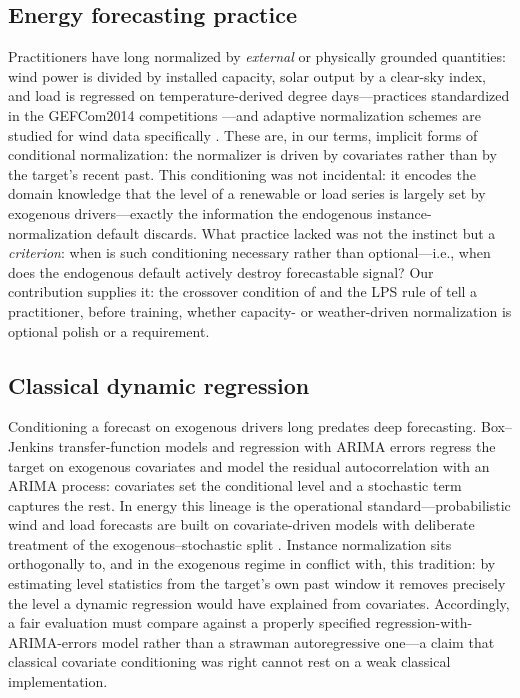 \subsection{Energy forecasting practice}

Practitioners have long normalized by \emph{external} or physically grounded quantities: wind power is divided by installed capacity, solar output by a clear-sky index, and load is regressed on temperature-derived degree days---practices standardized in the GEFCom2014 competitions \citep{hong2016gefcom}---and adaptive normalization schemes are studied for wind data specifically \citep{patil2022wind}. These are, in our terms, implicit forms of conditional normalization: the normalizer is driven by covariates rather than by the target's recent past. This conditioning was not incidental: it encodes the domain knowledge that the level of a renewable or load series is largely set by exogenous drivers---exactly the information the endogenous instance-normalization default discards. What practice lacked was not the instinct but a \emph{criterion}: when is such conditioning necessary rather than optional---i.e., when does the endogenous default actively destroy forecastable signal? Our contribution supplies it: the crossover condition of  and the LPS rule of  tell a practitioner, before training, whether capacity- or weather-driven normalization is optional polish or a requirement.

\subsection{Classical dynamic regression}

Conditioning a forecast on exogenous drivers long predates deep forecasting. Box--Jenkins transfer-function models and regression with ARIMA errors \citep{box1970time, hyndman2021fpp} regress the target on exogenous covariates and model the residual autocorrelation with an ARIMA process: covariates set the conditional level and a stochastic term captures the rest. In energy this lineage is the operational standard---probabilistic wind and load forecasts are built on covariate-driven models with deliberate treatment of the exogenous--stochastic split \citep{pinson2013wind, hong2016gefcom}. Instance normalization sits orthogonally to, and in the exogenous regime in conflict with, this tradition: by estimating level statistics from the target's own past window it removes precisely the level a dynamic regression would have explained from covariates. Accordingly, a fair evaluation must compare against a properly specified regression-with-ARIMA-errors model rather than a strawman autoregressive one---a claim that classical covariate conditioning was right cannot rest on a weak classical implementation.

